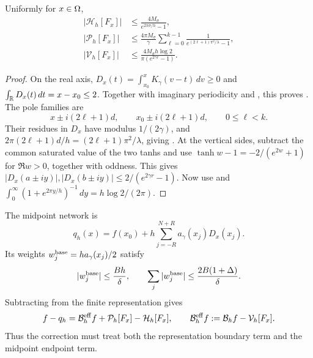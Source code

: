 \begin{lemma}
\label{lem:tanhquad}
Uniformly for $x\in\Omega$,
\begin{align}
 |\mathcal H_h[F_x]|&\le\frac{4M_\sigma}{e^{2\pi\sigma/h}-1},
 \label{eq:Hbound}\\
 |\mathcal P_h[F_x]|&\le\frac{4\pi M_\sigma}\gamma
 \sum_{\ell=0}^{k-1}\frac1{e^{(2\ell+1)\pi^2/\lambda}-1},
 \label{eq:Pbound}\\
 |\mathcal V_h[F_x]|&\le\frac{4M_\sigma h\log2}{\pi(e^{2\gamma r}-1)}.
 \label{eq:Vbound}
\end{align}
\end{lemma}
\begin{proof}
On the real axis, $D_x(t)=\int_{x_0}^xK_\gamma(v-t)\,dv\ge0$ and
$\int_\mathbb R D_x(t)\,dt=x-x_0\le2$. Together with imaginary periodicity and
, this proves .
The pole families are
\[
 x\pm i(2\ell+1)d,\qquad x_0\pm i(2\ell+1)d,
 \qquad 0\le\ell<k.
\]
Their residues in $D_x$ have modulus $1/(2\gamma)$, and
$2\pi(2\ell+1)d/h=(2\ell+1)\pi^2/\lambda$, giving .
At the vertical sides, subtract the common saturated value of the two tanhs
and use $\tanh w-1=-2/(e^{2w}+1)$ for $\Re w>0$, together with oddness.
This gives $|D_x(a\pm iy)|,|D_x(b\pm iy)|\le2/(e^{2\gamma r}-1)$.
Now use  and
$\int_0^\infty(1+e^{2\pi y/h})^{-1}\,dy=h\log2/(2\pi)$.
\end{proof}
The midpoint network is
\begin{equation}
 q_h(x)=f(x_0)+h\sum_{j=-R}^{N+R}a_\gamma(x_j)D_x(x_j).
 \label{eq:baseline-network}
\end{equation}
Its weights $w_j^{\rm base}=ha_\gamma(x_j)/2$ satisfy
\begin{equation}
 |w_j^{\rm base}|\le\frac{Bh}\delta,\qquad
 \sum_j|w_j^{\rm base}|\le\frac{2B(1+\Delta)}\delta.
 \label{eq:baseline-coeff}
\end{equation}
Subtracting  from the finite representation gives
\begin{equation}
 f-q_h=\mathcal B_h^{\rm eff}f+\mathcal P_h[F_x]-\mathcal H_h[F_x],
 \qquad \mathcal B_h^{\rm eff}f:=\mathcal B_hf-\mathcal V_h[F_x].
 \label{eq:baseline-signed}
\end{equation}
Thus the correction must treat both the representation boundary term and the
midpoint endpoint term.

